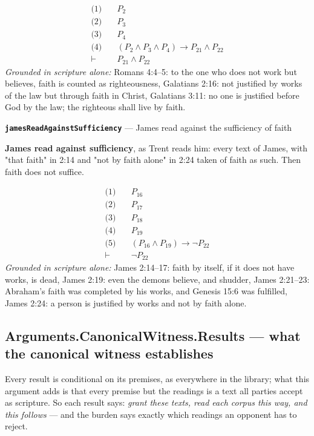 \documentclass[11pt]{article}
\begin{document}
\begin{align*}
  \text{(1)} \quad & P_{2} \\
  \text{(2)} \quad & P_{3} \\
  \text{(3)} \quad & P_{4} \\
  \text{(4)} \quad & (P_{2} \land P_{3} \land P_{4}) \rightarrow P_{21} \land P_{22} \\
  \vdash \quad & P_{21} \land P_{22}
\end{align*}
\emph{Grounded in scripture alone:} Romans 4:4–5: to the one who does not work but believes, faith is counted as righteousness, Galatians 2:16: not justified by works of the law but through faith in Christ, Galatians 3:11: no one is justified before God by the law; the righteous shall live by faith.
\par\medskip\noindent\textbf{\texttt{james\allowbreak{}Read\allowbreak{}Against\allowbreak{}Sufficiency}} --- James read against the sufficiency of faith\par\nobreak\noindent
\textbf{James read against sufficiency}, as Trent reads him: every text of James, with "that faith" in 2:14 and "not by faith alone" in 2:24 taken of faith as such. Then faith does not suffice.

\begin{align*}
  \text{(1)} \quad & P_{16} \\
  \text{(2)} \quad & P_{17} \\
  \text{(3)} \quad & P_{18} \\
  \text{(4)} \quad & P_{19} \\
  \text{(5)} \quad & (P_{16} \land P_{19}) \rightarrow \lnot P_{22} \\
  \vdash \quad & \lnot P_{22}
\end{align*}
\emph{Grounded in scripture alone:} James 2:14–17: faith by itself, if it does not have works, is dead, James 2:19: even the demons believe, and shudder, James 2:21–23: Abraham's faith was completed by his works, and Genesis 15:6 was fulfilled, James 2:24: a person is justified by works and not by faith alone.
\subsection*{Arguments.CanonicalWitness.Results — what the canonical witness establishes}
Every result is conditional on its premises, as everywhere in the library; what this argument adds is that every premise but the readings is a text all parties accept as scripture. So each result says: \emph{grant these texts, read each corpus this way, and this follows} — and the burden says exactly which readings an opponent has to reject.
\end{document}
